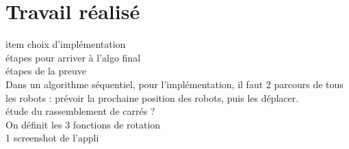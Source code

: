 \section{Travail réalisé}
item choix d'implémentation \\
étapes pour arriver à l'algo final \\
étapes de la preuve \\

Dans un algorithme séquentiel,
pour l'implémentation, il faut 2 parcours de tous les robots : prévoir la
prochaine position des robots, puis les déplacer. \\

étude du rassemblement de carrés ? \\

On définit les 3 fonctions de rotation \\

1 screenshot de l'appli
